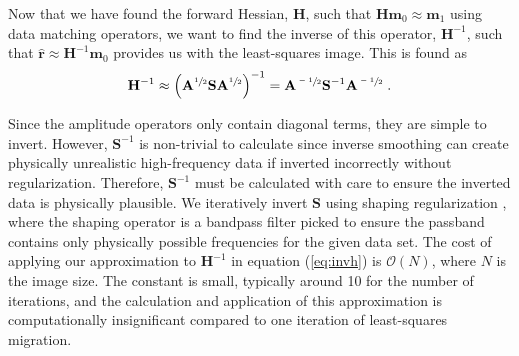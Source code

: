 %
    Now that we have found the forward Hessian, $\mathbf{H}$, such that $\mathbf{H}\mathbf{m}_0 \approx \mathbf{m}_1$ using data matching operators, we want to find the inverse of this operator, $\mathbf{H}^{-1}$, such that $\hat{\mathbf{r}} \approx \mathbf{H} ^{-1} \mathbf{m}_0$ provides us with the least-squares image.
    This is found as
    \begin{equation}
            \mathbf{H}^{-1} \approx \left ( \mathbf{A}^{\sfrac{1}{2}} \mathbf{S} \mathbf{A}^{\sfrac{1}{2}} \right )^{-1} = 
            \mathbf{A}^{\sfrac{-1}{2}} \mathbf{S}^{-1} \mathbf{A}^{\sfrac{-1}{2}}\;.
            \label{eq:invh}
    \end{equation}

    Since the amplitude operators only contain diagonal terms, they are simple to invert. 
    However, $\mathbf{S}^{-1}$ is non-trivial to calculate since inverse smoothing can create physically unrealistic high-frequency data if inverted incorrectly without regularization.
    Therefore, $\mathbf{S}^{-1}$ must be calculated with care to ensure the inverted data is physically plausible. 
    We iteratively invert $\mathbf{S}$ using shaping regularization \cite[]{shap}, where the shaping operator is a bandpass filter picked to ensure the passband contains only physically possible frequencies for the given data set.
    The cost of applying our approximation to $\mathbf{H}^{-1}$ in equation (\ref{eq:invh}) is $\mathcal{O}(N)$, where $N$ is the image size. 
    The constant is small, typically around 10 for the number of iterations, and the calculation and application of this approximation is computationally insignificant compared to one iteration of least-squares migration. %


